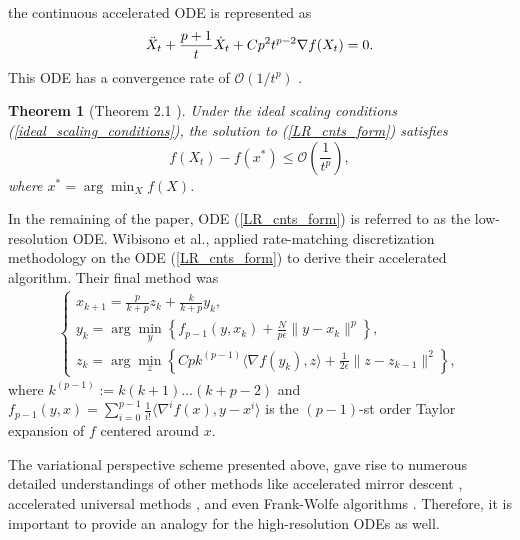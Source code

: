 \documentclass{article}
\theoremstyle{plain}
\newtheorem{thm}{\textbf{Theorem}}
\theoremstyle{definition}
\theoremstyle{remark}
\begin{document}
the continuous accelerated ODE is represented as
\begin{align}\label{LR_cnts_form}
        \Ddot{X}_t+ \frac{p+1}{t}\dot{X}_t+Cp^2t^{p-2}\nabla f(X_t)=0.
\end{align}
This ODE has a convergence rate of $\mathcal{O}(1/t^p)$ \cite{WibisonoE7351}.
\begin{thm}[Theorem 2.1 \cite{WibisonoE7351}]
    Under the ideal scaling conditions (\ref{ideal_scaling_conditions}), the solution to (\ref{LR_cnts_form}) satisfies
    $$f(X_t)-f(x^*)\leq \mathcal{O}(\frac{1}{t^p}),$$
    where $x^*=\arg\min_X f(X)$.
\end{thm}
In the remaining of the paper, ODE (\ref{LR_cnts_form}) is referred to as the low-resolution ODE. Wibisono et al., applied rate-matching discretization methodology on the ODE (\ref{LR_cnts_form}) to derive their accelerated algorithm. Their final method was 
\begin{align}\label{rate_match_1}
    \left\{\begin{array}{l}
    x_{k+1}=\frac{p}{k+p}z_k+\frac{k}{k+p}y_k,\\
    y_{k}=\arg \min_y\left\{ f_{p-1}(y,x_{k})+\frac{N}{p\epsilon}\|y-x_k\|^p  \right\},   \\
        z_{k}=\arg \min_z\left\{ Cpk^{(p-1)}\langle 
\nabla f(y_{k}),z \rangle+\frac{1}{2\epsilon}\|z-z_{k-1}\|^2  \right\},    
    \end{array}\right.
\end{align}
where $k^{(p-1)}:=k(k+1)\ldots (k+p-2)$ and $f_{p-1}(y,x)=\sum_{i=0}^{p-1}\frac{1}{i!}\langle \nabla^i f(x),y-x^i \rangle$ is the $(p-1)$-st order Taylor expansion of $f$ centered around $x$.\par
The variational perspective scheme presented above, gave rise to numerous detailed understandings of other methods like accelerated mirror descent \cite{nesterov2003introductory}, accelerated universal methods \cite{nesterov2015universal}, and even Frank-Wolfe algorithms \cite{frank1956algorithm,wilson2021lyapunov}. Therefore, it is important to provide an analogy for the high-resolution ODEs as well.
\end{document}
